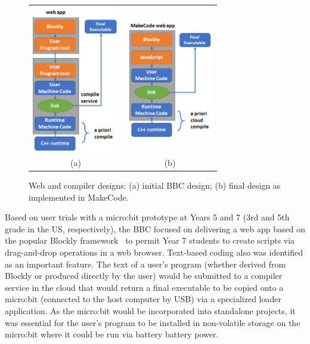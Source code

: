   \begin{figure} 
      \begin{tabular}[t]{cc}
        \includegraphics[width=1.5in]{images/bbc.png} &
        \includegraphics[width=1.5in]{images/makecode.png} \\
        (a) & (b) 
      \end{tabular}
    \caption{\label{fig:bbc}Web and compiler designs: (a) initial BBC design;
(b) final design as implemented in MakeCode.}
    \end{figure}

Based on user trials with a micro:bit prototype at Years 5 and 7 (3rd and 5th grade
in the US, respectively), the BBC focused on delivering a web app 
based on the popular Blockly framework~\cite{XYZ} to permit Year 7 students to create scripts 
via drag-and-drop operations in a web browser.  Text-based coding also was identified as an important feature.
The text of a user's program (whether derived from Blockly or produced directly by the user)
would be submitted to a compiler service in the cloud that
would return a final executable to be copied onto a micro:bit (connected to the host 
computer by USB) via a specialized loader application. As the micro:bit would be incorporated 
into standalone projects, it was essential for the user's program to be installed in non-volatile 
storage on the micro:bit where it could be run via battery battery power. 

